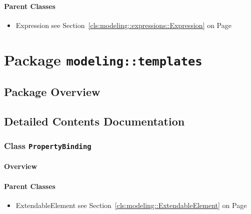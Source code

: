 \paragraph{Parent Classes}
\begin{itemize}
\item Expression see Section~\ref{cls:modeling::expressions::Expression} on Page~\pageref{cls:modeling::expressions::Expression}\end{itemize}
\newpage
		


\section{Package \bfseries \texttt{modeling::templates}\normalfont}
\subsection{Package Overview}
	
			
		



\subsection{Detailed Contents Documentation}
\subsubsection{\Large{Class \bfseries \texttt{PropertyBinding}\normalfont}}
\label{cls:modeling::templates::PropertyBinding} 
\paragraph{Overview}

	



\paragraph{Parent Classes}
\begin{itemize}
\item ExtendableElement see Section~\ref{cls:modeling::ExtendableElement} on Page~\pageref{cls:modeling::ExtendableElement}\end{itemize}
